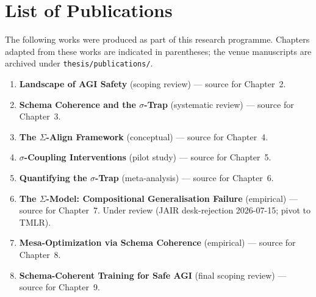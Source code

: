 \chapter*{List of Publications}

The following works were produced as part of this research programme. Chapters
adapted from these works are indicated in parentheses; the venue manuscripts
are archived under \texttt{thesis/publications/}.

\begin{enumerate}
  \item \textbf{Landscape of AGI Safety} (scoping review) — source for Chapter~2.
  \item \textbf{Schema Coherence and the $\sigma$-Trap} (systematic review) — source for Chapter~3.
  \item \textbf{The $\Sigma$-Align Framework} (conceptual) — source for Chapter~4.
  \item \textbf{$\sigma$-Coupling Interventions} (pilot study) — source for Chapter~5.
  \item \textbf{Quantifying the $\sigma$-Trap} (meta-analysis) — source for Chapter~6.
  \item \textbf{The $\Sigma$-Model: Compositional Generalisation Failure} (empirical) — source for Chapter~7. Under review (JAIR desk-rejection 2026-07-15; pivot to TMLR).
  \item \textbf{Mesa-Optimization via Schema Coherence} (empirical) — source for Chapter~8.
  \item \textbf{Schema-Coherent Training for Safe AGI} (final scoping review) — source for Chapter~9.
\end{enumerate}

